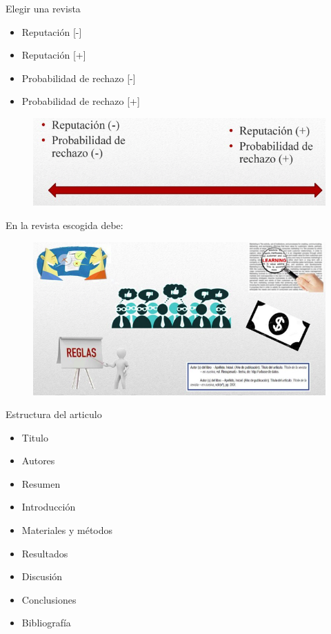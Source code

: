 \begin{frame}{Elegir una revista}
\begin{block}{}
\begin{itemize}
    \item Reputación [-]
    \item Reputación [+]
    \item Probabilidad de rechazo [-]
    \item Probabilidad de rechazo [+]
\end{itemize}
\end{block} 
\begin{figure}[H]
    \includegraphics[scale=0.5]{images/paso1.png}
    \label{fig:boat1}
\end{figure}
\end{frame}

\begin{frame}{En la revista escogida debe: }
\begin{figure}[H]
    \includegraphics[scale=0.5]{images/paso2.png}
    \label{fig:boat1}
\end{figure}
\end{frame}

\begin{frame}{Estructura del articulo}
\begin{block}{}
\begin{itemize}
    \item Titulo 
    \item Autores
    \item Resumen
    \item Introducción
    \item Materiales y métodos
    \item Resultados
    \item Discusión 
    \item Conclusiones
    \item Bibliografía
\end{itemize}
\end{block}   
\end{frame}


